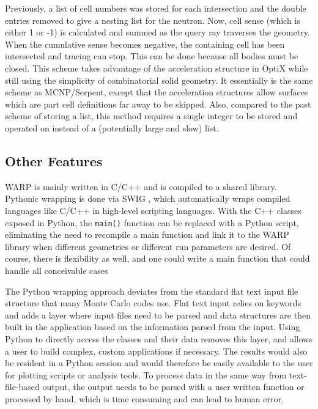 \documentclass[preprint,12pt]{elsarticle}
\begin{document}
Previously, a list of cell numbers was stored for each intersection and the double entries removed to give a nesting list for the neutron.  Now, cell sense (which is either 1 or -1) is calculated and summed as the query ray traverses the geometry.  When the cumulative sense becomes negative, the containing cell has been intersected and tracing can stop.  This can be done because all bodies must be closed.  This scheme takes advantage of the acceleration structure in OptiX while still using the simplicity of combinatorial solid geometry.  It essentially is the same scheme as MCNP/Serpent, except that the acceleration structures allow surfaces which are part cell definitions far away to be skipped.  Also, compared to the past scheme of storing a list, this method requires a single integer to be stored and operated on instead of a (potentially large and slow) list.

\subsection{Other Features}

WARP is mainly written in C/C++ and is compiled to a shared library.  Pythonic wrapping is done via SWIG \cite{swig}, which automatically wraps compiled languages like C/C++ in high-level scripting languages.  With the C++ classes exposed in Python, the \texttt{main()} function can be replaced with a Python script, eliminating the need to recompile a main function and link it to the WARP library when different geometries or different run parameters are desired.  Of course, there is flexibility as well, and one could write a main function that could handle all conceivable cases 

The Python wrapping approach deviates from the standard flat text input file structure that many Monte Carlo codes use.  Flat text input relies on keywords and adds a layer where input files need to be parsed and data structures are then built in the application based on the information parsed from the input.  Using Python to directly access the classes and their data removes this layer, and allows a user to build complex, custom applications if necessary.  The results would also be resident in a Python session and would therefore be easily available to the user for plotting scripts or analysis tools.  To process data in the same way from text-file-based output, the output needs to be parsed with a user written function or processed by hand, which is time consuming and can lead to human error.
\end{document}
